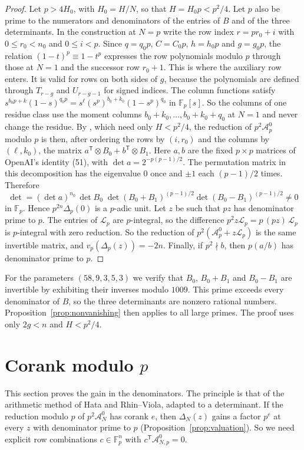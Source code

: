 \documentclass[11pt]{amsart}
\theoremstyle{definition}
\theoremstyle{remark}
\numberwithin{equation}{section}
\newcommand{\F}{\mathbb F}
\newcommand{\cA}{\mathcal A}
\newcommand{\cL}{\mathcal L}
\begin{document}
\begin{proof}
Let $p>4H_0$, with $H_0=H/N$, so that $H=H_0p<p^2/4$. Let $p$ also be prime to the numerators and
denominators of the entries of $B$ and of the three determinants. In the construction at $N=p$ write the
row index $r=pr_0+i$ with $0\le r_0<n_0$ and $0\le i<p$. Since $q=q_0p$, $C=C_0p$, $h=h_0p$ and $g=g_0p$,
the relation $(1-t)^{p}\equiv1-t^p$ expresses the row polynomials modulo $p$ through those at $N=1$ and the
successor row $r_0+1$. This is where the auxiliary row enters. It is valid for rows on both sides of $g$,
because the polynomials are defined through $T_{r-g}$ and $U_{r-g-1}$ for signed indices. The column
functions satisfy $s^{b_0p+k}(1-s)^{q_0p}=s^{\ell}(s^p)^{b_0+k_0}(1-s^p)^{q_0}$ in $\F_p[s]$. So the
columns of one residue class use the moment columns $b_0+k_0,\dots,b_0+k_0+q_0$ at $N=1$ and never change
the residue. By \cite[Lemma~3.1 and eqs.~(31), (35), (36)]{OpenAI2026}, which need only $H<p^2/4$, the
reduction of $p^2\cA^0_p$ modulo $p$ is then, after ordering the rows by $(i,r_0)$ and the columns by
$(\ell,k_0)$, the matrix $a^{\mathsf T}\otimes B_0+b^{\mathsf T}\otimes B_1$. Here $a,b$ are the fixed
$p\times p$ matrices of OpenAI's identity (51), with $\det a=2^{-p(p-1)/2}$. The permutation matrix in this
decomposition has the eigenvalue $0$ once and $\pm1$ each $(p-1)/2$ times. Therefore
\[
 \det=(\det a)^{n_0}\,\det B_0\;\det(B_0+B_1)^{(p-1)/2}\det(B_0-B_1)^{(p-1)/2}\ne0
\]
in $\F_p$. Hence $p^{2n}\Delta_p(0)$ is a $p$-adic unit. Let $z$ be such that $pz$ has denominator prime to
$p$. The entries of $\cL_p$ are $p$-integral, so the difference $p^2z\cL_p=p\,(pz)\,\cL_p$ is $p$-integral
with zero reduction. So the reduction of $p^2(\cA^0_p+z\cL_p)$ is the same invertible matrix, and
$v_p(\Delta_p(z))=-2n$. Finally, if $p^2\nmid b$, then $p(a/b)$ has denominator prime to $p$.
\end{proof}

For the parameters $(58,9,3,5,3)$ we verify that $B_0$, $B_0+B_1$ and $B_0-B_1$ are invertible by exhibiting
their inverses modulo $1009$. This prime exceeds every denominator of $B$, so the three determinants are
nonzero rational numbers. Proposition~\ref{prop:nonvanishing} then applies to all large primes. The proof
uses only $2g<n$ and $H<p^2/4$.
\section{Corank modulo $p$}\label{sec:content}

This section proves the gain in the denominators. The principle is that of the arithmetic method of Hata
and Rhin--Viola, adapted to a determinant. If the reduction modulo $p$ of $p^2\cA^0_N$ has corank $e$, then
$\Delta_N(z)$ gains a factor $p^e$ at every $z$ with denominator prime to $p$
(Proposition~\ref{prop:valuation}). So we need explicit row combinations $c\in\F_p^n$ with
$c^{\mathsf T}\cA^0_{N,p}=0$.
\end{document}
